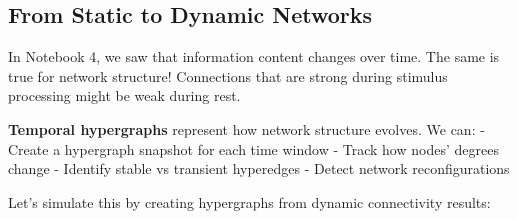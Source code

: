 \documentclass[
  11pt,
  letterpaper,
  oneside,
  openany]{book}
\begin{document}
\subsection{From Static to Dynamic
Networks}\label{from-static-to-dynamic-networks}

In Notebook 4, we saw that information content changes over time. The
same is true for network structure! Connections that are strong during
stimulus processing might be weak during rest.

\textbf{Temporal hypergraphs} represent how network structure evolves.
We can: - Create a hypergraph snapshot for each time window - Track how
nodes' degrees change - Identify stable vs transient hyperedges - Detect
network reconfigurations

Let's simulate this by creating hypergraphs from dynamic connectivity
results:
\end{document}
